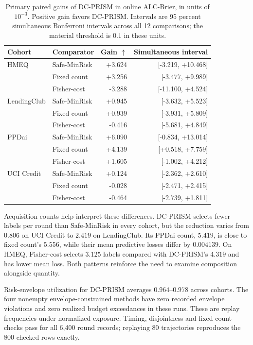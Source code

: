 \documentclass[runningheads]{llncs}
\begin{document}
\begin{table}[t]
\caption{Primary paired gains of DC-PRISM in online ALC-Brier, in units of $10^{-3}$. Positive gain favors DC-PRISM. Intervals are 95 percent simultaneous Bonferroni intervals across all 12 comparisons; the material threshold is $0.1$ in these units.}
\label{tab:replay_intervals}
\centering
\small
\begin{tabular}{llrr}
\toprule
Cohort & Comparator & Gain $\uparrow$ & Simultaneous interval \\
\midrule
HMEQ & Safe-MinRisk & +3.624 & [-3.219, +10.468] \\
 & Fixed count & +3.256 & [-3.477, +9.989] \\
 & Fisher-cost & -3.288 & [-11.100, +4.524] \\
\addlinespace
LendingClub & Safe-MinRisk & +0.945 & [-3.632, +5.523] \\
 & Fixed count & +0.939 & [-3.931, +5.809] \\
 & Fisher-cost & -0.416 & [-5.681, +4.849] \\
\addlinespace
PPDai & Safe-MinRisk & +6.090 & [-0.834, +13.014] \\
 & Fixed count & +4.139 & [+0.518, +7.759] \\
 & Fisher-cost & +1.605 & [-1.002, +4.212] \\
\addlinespace
UCI Credit & Safe-MinRisk & +0.124 & [-2.362, +2.610] \\
 & Fixed count & -0.028 & [-2.471, +2.415] \\
 & Fisher-cost & -0.464 & [-2.739, +1.811] \\
\bottomrule
\end{tabular}
\end{table}


Acquisition counts help interpret these differences. DC-PRISM selects fewer labels per round than Safe-MinRisk in every cohort, but the reduction varies from $0.806$ on UCI Credit to $2.419$ on LendingClub. Its PPDai count, $5.419$, is close to fixed count's $5.556$, while their mean predictive losses differ by $0.004139$. On HMEQ, Fisher-cost selects $3.125$ labels compared with DC-PRISM's $4.319$ and has lower mean loss. Both patterns reinforce the need to examine composition alongside quantity.

Risk-envelope utilization for DC-PRISM averages $0.964$--$0.978$ across cohorts. The four nonempty envelope-constrained methods have zero recorded envelope violations and zero realized budget exceedances in these runs. These are replay frequencies under normalized exposure. Timing, disjointness and fixed-count checks pass for all 6,400 round records; replaying 80 trajectories reproduces the 800 checked rows exactly.
\end{document}
